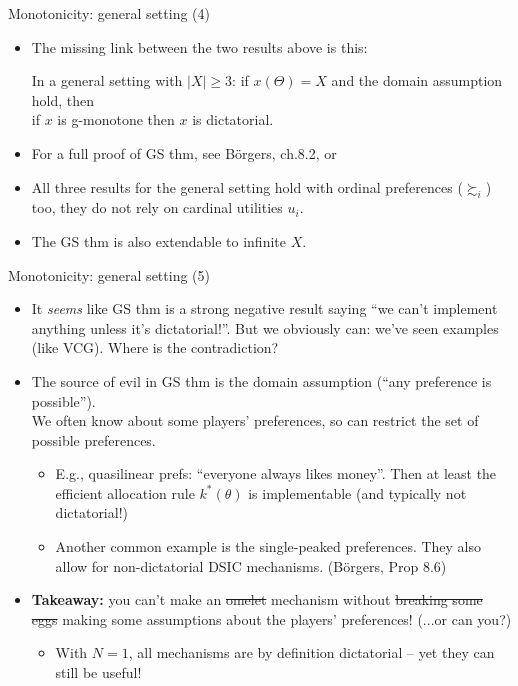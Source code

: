\documentclass[english,10pt
,aspectratio=169
]{beamer}
\begin{document}
\begin{frame}{Monotonicity: general setting (4)}
	\begin{itemize}
		\item The missing link between the two results above is this:
		\begin{theorem}
			In a general setting with $|X|\geq 3$: if $x(\Theta)=X$ and the domain assumption hold, then\\
			\centering
			if $x$ is g-monotone then $x$ is dictatorial.
		\end{theorem}
		\item For a full proof of GS thm, see B{\"o}rgers, ch.8.2, or \cite{svensson_proof_2014}
		\item All three results for the general setting hold with ordinal preferences ($\succsim_i$) too, they do not rely on cardinal utilities $u_i$.
		\item The GS thm is also extendable to infinite $X$.
	\end{itemize}
\end{frame}


\begin{frame}{Monotonicity: general setting (5)}
	\begin{itemize}
		\item It \emph{seems} like GS thm is a strong negative result saying ``we can't implement anything unless it's dictatorial!''. But we obviously can: we've seen examples (like VCG). Where is the contradiction?
		\item The source of evil in GS thm is the \alert{domain} assumption (``any preference is possible''). \\
		We often know  about some players' preferences, so can restrict the set of possible preferences.
		\begin{itemize}
			\item E.g., quasilinear prefs: ``everyone always likes money''. Then at least the efficient allocation rule $k^*(\theta)$ is implementable (and typically not dictatorial!)
			\item Another common example is the single-peaked preferences. They also allow for non-dictatorial DSIC mechanisms. (B{\"o}rgers, Prop 8.6)
		\end{itemize}
		\item \textbf{Takeaway:} you can't make an \sout{omelet} mechanism without \sout{breaking some eggs} making some assumptions about the players' preferences! (...or can you?)
		\begin{itemize}
			\item With $N=1$, all mechanisms are by definition dictatorial -- yet they can still be useful!
		\end{itemize}
	\end{itemize}
\end{frame}
\end{document}
